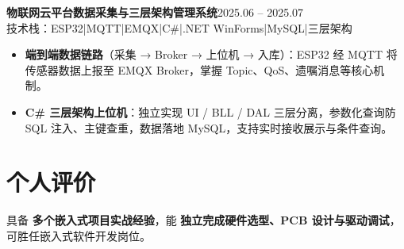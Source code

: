 \documentclass[10pt,a4paper]{article}
\newcommand{\projectblock}[3]{%
    {\bfseries\color{darktext}#1}\hfill{\color{graytext}#2}\\%
    {\small\color{graytext}#3}%
    \vspace{0.06em}%
}
\begin{document}
\projectblock{物联网云平台数据采集与三层架构管理系统}{2025.06 -- 2025.07}{技术栈：ESP32\hspace{0.3em}|\hspace{0.3em}MQTT\hspace{0.3em}|\hspace{0.3em}EMQX\hspace{0.3em}|\hspace{0.3em}C\#\hspace{0.3em}|\hspace{0.3em}.NET WinForms\hspace{0.3em}|\hspace{0.3em}MySQL\hspace{0.3em}|\hspace{0.3em}三层架构}

\begin{itemize}[leftmargin=1.5em, itemsep=1.5pt, parsep=0pt, topsep=1.5pt]
    \item \textbf{端到端数据链路}（采集 → Broker → 上位机 → 入库）：ESP32 经 MQTT 将传感器数据上报至 EMQX Broker，掌握 Topic、QoS、遗嘱消息等核心机制。
    \item \textbf{C\# 三层架构上位机}：独立实现 UI / BLL / DAL 三层分离，参数化查询防 SQL 注入、主键查重，数据落地 MySQL，支持实时接收展示与条件查询。
\end{itemize}

\vspace{0.06em}

\section{\faUser\hspace{0.4em}个人评价}

具备 \textbf{多个嵌入式项目实战经验}，能 \textbf{独立完成硬件选型、PCB 设计与驱动调试}，可胜任嵌入式软件开发岗位。
\end{document}
